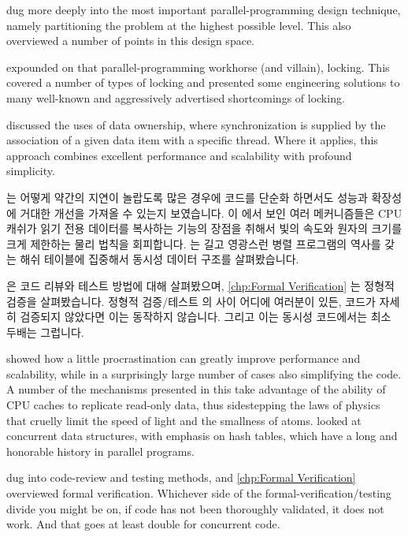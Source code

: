  dug more deeply
into the most important parallel-programming design technique, namely
partitioning the problem at the highest possible level.
This  also
overviewed a number of points in this design space.

 expounded on that parallel-programming workhorse
(and villain), locking.
This  covered a number of types of locking
and presented some engineering solutions to many well-known and
aggressively advertised shortcomings of locking.

 discussed the uses of data ownership, where
synchronization is supplied by the association of a given data item
with a specific thread.
Where it applies, this approach combines excellent performance and
scalability with profound simplicity.

\fi

 는 어떻게 약간의 지연이 놀랍도록 많은 경우에
코드를 단순화 하면서도 성능과 확장성에 거대한 개선을 가져올 수 있는지
보였습니다.
이  에서 보인 여러 메커니즘들은 CPU 캐쉬가
읽기 전용 데이터를 복사하는 기능의 장점을 취해서 빛의 속도와 원자의 크기를 크게
제한하는 물리 법칙을 회피합니다.
 는 길고 영광스런 병렬 프로그램의 역사를 갖는 해쉬
테이블에 집중해서 동시성 데이터 구조를 살펴봤습니다.

 은 코드 리뷰와 테스트 방법에 대해 살펴봤으며,
\cref{chp:Formal Verification} 는 정형적 검증을 살펴봤습니다.
정형적 검증/\-테스트 의 사이 어디에 여러분이 있든, 코드가 자세히 검증되지
않았다면 이는 동작하지 않습니다.
그리고 이는 동시성 코드에서는 최소 두배는 그럽니다.

\iffalse

 showed how a little procrastination can
greatly improve performance and scalability, while in a surprisingly large
number of cases also simplifying the code.
A number of the mechanisms presented in this
take advantage of the ability of CPU caches to replicate read-only data,
thus sidestepping the laws of physics that cruelly limit the speed of
light and the smallness of atoms.
 looked at concurrent data structures, with
emphasis on hash tables, which have a long and honorable history in
parallel programs.

 dug into code-review and testing methods, and
\cref{chp:Formal Verification} overviewed formal verification.
Whichever side of the formal-verification/\-testing divide you might
be on, if code has not been thoroughly validated, it does not work.
And that goes at least double for concurrent code.


